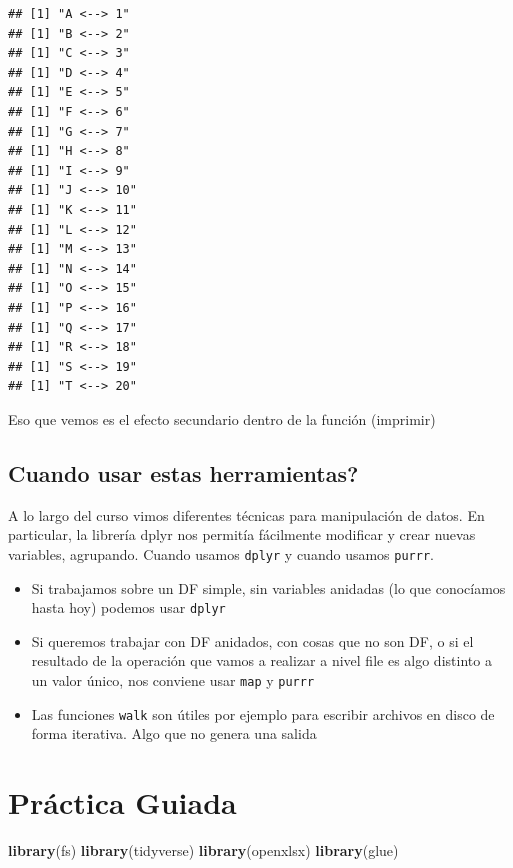 \documentclass[]{book}
\newenvironment{Shaded}{\begin{snugshade}}{\end{snugshade}}
\newcommand{\KeywordTok}[1]{\textcolor[rgb]{0.13,0.29,0.53}{\textbf{#1}}}
\newcommand{\NormalTok}[1]{#1}
\begin{document}
\begin{verbatim}
## [1] "A <--> 1"
## [1] "B <--> 2"
## [1] "C <--> 3"
## [1] "D <--> 4"
## [1] "E <--> 5"
## [1] "F <--> 6"
## [1] "G <--> 7"
## [1] "H <--> 8"
## [1] "I <--> 9"
## [1] "J <--> 10"
## [1] "K <--> 11"
## [1] "L <--> 12"
## [1] "M <--> 13"
## [1] "N <--> 14"
## [1] "O <--> 15"
## [1] "P <--> 16"
## [1] "Q <--> 17"
## [1] "R <--> 18"
## [1] "S <--> 19"
## [1] "T <--> 20"
\end{verbatim}

Eso que vemos es el efecto secundario dentro de la función (imprimir)

\hypertarget{cuando-usar-estas-herramientas}{%
\subsection{Cuando usar estas herramientas?}\label{cuando-usar-estas-herramientas}}

A lo largo del curso vimos diferentes técnicas para manipulación de datos. En particular, la librería dplyr nos permitía fácilmente modificar y crear nuevas variables, agrupando. Cuando usamos \texttt{dplyr} y cuando usamos \texttt{purrr}.

\begin{itemize}
\item
  Si trabajamos sobre un DF simple, sin variables anidadas (lo que conocíamos hasta hoy) podemos usar \texttt{dplyr}
\item
  Si queremos trabajar con DF anidados, con cosas que no son DF, o si el resultado de la operación que vamos a realizar a nivel file es algo distinto a un valor único, nos conviene usar \texttt{map} y \texttt{purrr}
\item
  Las funciones \texttt{walk} son útiles por ejemplo para escribir archivos en disco de forma iterativa. Algo que no genera una salida
\end{itemize}

\hypertarget{practica-guiada-2}{%
\section{Práctica Guiada}\label{practica-guiada-2}}

\begin{Shaded}
\begin{Highlighting}[]
\KeywordTok{library}\NormalTok{(fs)}
\KeywordTok{library}\NormalTok{(tidyverse)}
\KeywordTok{library}\NormalTok{(openxlsx)}
\KeywordTok{library}\NormalTok{(glue)}
\end{Highlighting}
\end{Shaded}
\end{document}
